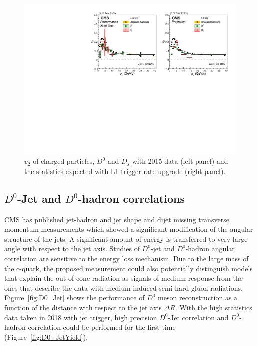 \begin{figure}[!ht]
\begin{center}
\includegraphics[width=.98\textwidth]{figures/cV2_lumiMB_1.pdf}
\caption{$v_2$ of charged particles, $D^0$ and $D_s$ with 2015 data (left panel) and the statistics expected with L1 trigger rate upgrade (right panel).}
\label{fig:v2_projection}
\end{center}
\end{figure}



\subsection{$D^0$-Jet and $D^0$-hadron correlations}

CMS has published jet-hadron and jet shape and dijet missing transverse momentum measurements which showed a significant modification of the angular structure of the jets. A significant amount of energy is transferred to very large angle with respect to the jet axis. Studies of $D^0$-jet and $D^0$-hadron angular correlation are sensitive to the energy loss mechanism. Due to the large mass of the c-quark, the proposed measurement could also potentially distinguish models that explain the out-of-cone radiation as signals of medium response from the ones that describe the data with medium-induced semi-hard gluon radiations. Figure~\ref{fig:D0_Jet} shows the performance of $D^0$ meson reconstruction as a function of the distance with respect to the jet axis $\Delta R$. With the high statistics data taken in 2018 with jet trigger, high precision $D^0$-Jet correlation and $D^0$-hadron correlation could be performed for the first time (Figure~\ref{fig:D0_JetYield}).

